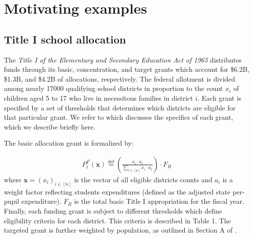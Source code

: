 \documentclass[9pt,lineno,twocolumn,twoside]{pnas-new}
\begin{document}


    \section*{Motivating examples}

    \subsection{Title I school allocation}
    The \emph{Title I of the Elementary and Secondary Education Act of
    1965} \cite{Sonnenberg:16} distributes funds through its basic, concentration, and target grants which account for \$6.2B, \$1.3B, and \$4.2B of allocations, respectively. The federal allotment is divided among nearly 17000 qualifying school
    districts in proportion to the count $x_i$ of children aged 5 to 17
    who live in necessitous families in district $i$. Each grant is specified by a set of thresholds that determines which districts are eligible for that particular grant. We refer to \cite{Sonnenberg:16} which discusses the specifics of each grant, which we describe briefly here.

    The basic allocation grant is formalized by:
    \newcommand{\tfa}{P^F}
    \newcommand{\rev}[1]{{\color{purple}{#1}}}
    \newcommand{\add}[1]{{\color{darkgreen}{#1}}}
    \newcommand*{\defeq}{\stackrel{\text{def}}{=}}
    \def\aux{\mathrm{aux}}

    \begin{align}
        \label{eq:allotment}%
        \tfa_i(\bm{x}) \defeq \left(
        \frac{x_i \cdot a_i}{\sum_{i \in [n] }x_i \cdot a_i}\right) \cdot F_{B}
    \end{align}
    where $\bm{x} = (x_i)_{i\in[n]}$ is the vector of all eligible districts counts
    and $a_i$ is a weight factor reflecting students expenditures (defined as the adjusted state per-pupil expenditure). $F_{B}$ is the total basic Title I appropriation for the fiscal year. Finally, each funding grant is subject to different thresholds which define eligibility criteria for each district. This criteria is described in Table 1. The targeted grant is further weighted by population, as outlined in Section A of \cite{Sonnenberg:16}.
\end{document}
